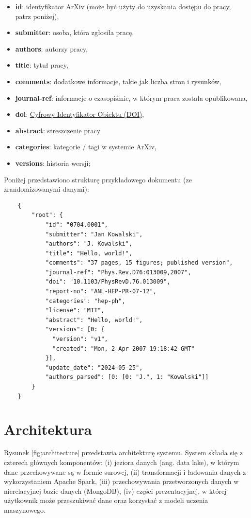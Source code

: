 \documentclass[10pt]{article}
\begin{document}
\begin{itemize}
    \item \textbf{id}: identyfikator ArXiv (może być użyty do uzyskania dostępu do pracy, patrz poniżej),
    \item \textbf{submitter}: osoba, która zgłosiła pracę,
    \item \textbf{authors}: autorzy pracy,
    \item \textbf{title}: tytuł pracy,
    \item \textbf{comments}: dodatkowe informacje, takie jak liczba stron i rysunków,
    \item \textbf{journal-ref}: informacje o czasopiśmie, w którym praca została opublikowana,
    \item \textbf{doi}: \href{https://www.doi.org}{Cyfrowy Identyfikator Obiektu (DOI)},
    \item \textbf{abstract}: streszczenie pracy
    \item \textbf{categories}: kategorie / tagi w systemie ArXiv,
    \item \textbf{versions}: historia wersji;
\end{itemize}

Poniżej przedstawiono strukturę przykładowego dokumentu (ze zrandomizowanymi danymi):
\begin{lstlisting}
    {
        "root": {
            "id": "0704.0001",
            "submitter": "Jan Kowalski",
            "authors": "J. Kowalski",
            "title": "Hello, world!",
            "comments": "37 pages, 15 figures; published version",
            "journal-ref": "Phys.Rev.D76:013009,2007",
            "doi": "10.1103/PhysRevD.76.013009",
            "report-no": "ANL-HEP-PR-07-12",
            "categories": "hep-ph",
            "license": "MIT",
            "abstract": "Hello, world!",
            "versions": [0: {
              "version": "v1",
              "created": "Mon, 2 Apr 2007 19:18:42 GMT"
            }],
            "update_date": "2024-05-25",
            "authors_parsed": [0: [0: "J.", 1: "Kowalski"]]
        }
    }
\end{lstlisting}

\section{Architektura}

Rysunek \ref{fig:architecture} przedstawia architekturę systemu. System składa się z czterech głównych komponentów: (i) jeziora danych (ang. data lake), w którym dane przechowywane są w formie surowej, (ii) transformacji i ładowania danych z wykorzystaniem Apache Spark, (iii) przechowywania przetworzonych danych w nierelacyjnej bazie danych (MongoDB), (iv) części prezentacyjnej, w której użytkownik może przeszukiwać dane oraz korzystać z modeli uczenia maszynowego.
\end{document}
